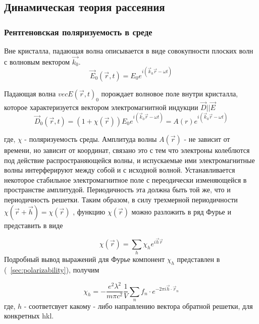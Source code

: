 \subsection{Динамическая теория рассеяния}
  
  


 \subsubsection{Рентгеновская поляризуемость в среде}

 Вне кристалла, падающая волна описывается в виде совокупности плоских волн с волновым вектором  $\vec{k_0}$.
 \begin{equation}
   \vec{E}_0(\vec{r},t) = E_0 e^{i(\vec{k}_0\vec{r}-\omega t)}
  \end{equation}

Падающая волна $vec{E}(\vec{r},t)_0$ порождает волновое поле внутри кристалла, которое характеризуется вектором
электромагнитной индукции $\vec{D}||\vec{E}$
\begin{equation}
  \vec{D}_0(\vec{r},t) = (1+\chi(\vec{r})) E_0 e^{i(\vec{k}_0\vec{r}-\omega t)} = A(r) e^{i(\vec{k}_0\vec{r}-\omega t)}
 \end{equation}

где, $\chi$ - поляризуемость среды. Амплитуда волны $A(\vec{r})$ - не зависит
от времени, но зависит от координат, связано
это с тем что электроны колеблются под действие распространяющейся волны, и испускаемые ими
электромагнитные волны интерферируют между собой и с исходной волной. Устанавливается некоторое стабильное
электромагнитное поле с переодически изменяющейся в пространстве амплитудой. Периодичность эта должна быть
той же, что и периодичность решетки. Таким образом, в силу трехмерной периодичности $\chi(\vec{r}+\vec{h}) = \chi(\vec{r})$
, функцию $\chi(\vec{r})$ можно разложить в ряд Фурье и представить в виде

\begin{equation}
\chi(\vec{r}) = \sum_{h}\chi_h e^{i\vec{h}\vec{r}}
 \end{equation}
Подробный вывод выражений для Фурье компонент $\chi_h$ представлен в (~\ref{sec:polarizability}), получим


\begin{equation}
\chi_h = -\frac{e^2 \lambda^2}{m \pi c^2} \frac{1}{V} \sum_{n} f_n \cdot e^{-2\pi i\vec{h}\cdot \vec{r}_n}
 \end{equation}
где, $h$ - соответсвует какому - либо направлению вектора обратной решетки, для конкретных {hkl}.

